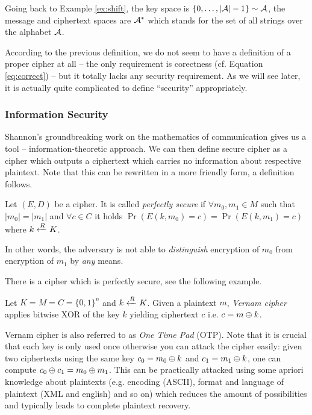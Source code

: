 \begin{note}
	Going back to Example \ref{ex:shift}, the key space is $\{0 , \ldots , |{\cal A}|-1\}\sim\cal A$, the message and ciphertext spaces are ${\cal A}^*$ which stands for the set of all strings over the alphabet $\cal A$.
\end{note}

According to the previous definition, we do not seem to have a definition of a proper cipher at all -- the only requirement is corectness (cf. Equation \ref{eq:correct}) -- but it totally lacks any security requirement. As we will see later, it is actually quite complicated to define ``security'' appropriately.

\subsubsection{Information Security}

Shannon's groundbreaking work \cite{shannon1949mathematical} on the mathematics of communication gives us a tool -- information-theoretic approach. We can then define secure cipher as a cipher which outputs a ciphertext which carries no information about respective plaintext. Note that this can be rewritten in a more friendly form, a definition follows.

\begin{defn}
\label{def:perfsec}
	Let $(E,D)$ be a cipher. It is called {\em perfectly secure} if $\forall m_0,m_1\in M$ such that $|m_0| = |m_1|$ and $\forall c\in C$ it holds $\Pr\left(E(k,m_0)=c\right) = \Pr\left(E(k,m_1)=c\right)$ where $k\xleftarrow{R} K$.
\end{defn}

\begin{note}
\label{note:indist}
	In other words, the adversary is not able to {\em distinguish} encryption of $m_0$ from encryption of $m_1$ by {\em any} means.
\end{note}

There is a cipher which is perfectly secure, see the following example.

\begin{example}
	Let $K = M = C = \{0,1\}^n$ and $k\xleftarrow{R} K$. Given a plaintext $m$, {\em Vernam cipher} applies bitwise XOR of the key $k$ yielding ciphertext $c$ i.e. $c = m\oplus k$.
\end{example}

\begin{note}
	Vernam cipher is also referred to as {\em One Time Pad} (OTP). Note that it is crucial that each key is only used once otherwise you can attack the cipher easily: given two ciphertexts using the same key $c_0=m_0\oplus k$ and $c_1=m_1\oplus k$, one can compute $c_0\oplus c_1 = m_0\oplus m_1$. This can be practically attacked using some apriori knowledge about plaintexts (e.g. encoding (ASCII), format and language of plaintext (XML and english) and so on) which reduces the amount of possibilities and typically leads to complete plaintext recovery.
\end{note}

